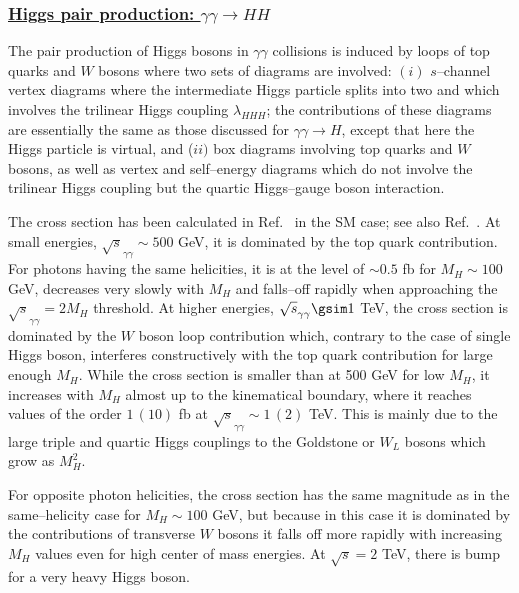 \subsubsection*{\underline{Higgs pair production: $\gamma \gamma \to HH$}}

The pair production of Higgs bosons in $\gamma \gamma$ collisions is induced by
loops of top quarks and $W$ bosons where two sets of diagrams are involved:
$(i)$ $s$--channel vertex diagrams where the intermediate Higgs particle splits
into two and which involves the trilinear Higgs coupling $\lambda_{HHH}$;
the contributions of these diagrams are essentially the same as those discussed
for $\gamma \gamma \to H$, except that here the Higgs particle is virtual, and 
($ii)$ box diagrams involving top quarks and $W$ bosons, as well as
vertex and self--energy diagrams which do not involve the trilinear Higgs
coupling but the quartic Higgs--gauge boson interaction. \s

The cross section has been calculated in Ref.~\cite{gam-HH} in the SM case; see
also Ref.~\cite{gam-HH1}. At small energies, $\sqrt{s}_{\gamma \gamma} \sim
500$ GeV, it is dominated by the top quark contribution. For photons having the
same helicities,  it is at the level of $\sim 0.5$ fb for $M_H \sim 100$ GeV,
decreases very slowly with $M_H$ and falls--off rapidly when approaching the
$\sqrt{s}_{\gamma \gamma} =2M_H$ threshold.  At higher energies,
$\sqrt{s}_{\gamma \gamma} \gsim 1$ TeV, the cross section is dominated by the
$W$ boson loop contribution which, contrary to the case of single Higgs boson,
interferes constructively with the top quark contribution for large enough
$M_H$.  While the cross section  is smaller than at 500 GeV for low $M_H$, it
increases with $M_H$ almost up to the kinematical boundary, where it reaches
values of the order $1\, (10)$ fb at $\sqrt{s}_{\gamma \gamma} \sim 1\, (2)$
TeV.  This is mainly due to the large triple and quartic Higgs couplings to the
Goldstone or $W_L$ bosons which grow as $M_H^2$.\s 

 For opposite photon helicities, the cross section has the same magnitude as 
in the same--helicity case for $M_H\sim 100$ GeV, but because in this case it  
is dominated by the contributions of transverse $W$ bosons it  falls off more
rapidly with increasing $M_H$ values even for high center of mass energies. At 
$\sqrt{s}=2$ TeV, there is bump for a very heavy Higgs boson. \s

